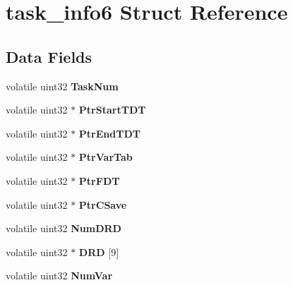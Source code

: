 \hypertarget{structtask__info6}{}\section{task\+\_\+info6 Struct Reference}
\label{structtask__info6}
\subsection*{Data Fields}
\begin{DoxyCompactItemize}
\item 
\mbox{\label{structtask__info6_a00688cd13d90e64af8a6f8ddcfe17eef}} 
volatile uint32 {\bfseries Task\+Num}
\item 
\mbox{\label{structtask__info6_a7cc9676280f0540792221f977de6d79a}} 
volatile uint32 $\ast$ {\bfseries Ptr\+Start\+T\+DT}
\item 
\mbox{\label{structtask__info6_a6288cccb93cd49597702a9d2d3916c34}} 
volatile uint32 $\ast$ {\bfseries Ptr\+End\+T\+DT}
\item 
\mbox{\label{structtask__info6_ab35b8516e2d64d15ef0f31ded004218b}} 
volatile uint32 $\ast$ {\bfseries Ptr\+Var\+Tab}
\item 
\mbox{\label{structtask__info6_a07a06993654ea53f0c0509459d3e17e4}} 
volatile uint32 $\ast$ {\bfseries Ptr\+F\+DT}
\item 
\mbox{\label{structtask__info6_a16d79a3106a103bce966be33640194c6}} 
volatile uint32 $\ast$ {\bfseries Ptr\+C\+Save}
\item 
\mbox{\label{structtask__info6_a3cd9aa13119e41a8a22f9f690e0ed13a}} 
volatile uint32 {\bfseries Num\+D\+RD}
\item 
\mbox{\label{structtask__info6_a726f9e59f3b655c3c159f812aebc8993}} 
volatile uint32 $\ast$ {\bfseries D\+RD} \mbox{[}9\mbox{]}
\item 
\mbox{\label{structtask__info6_ae0ab6aea12639d3bbbd044b4b0979fd1}} 
volatile uint32 {\bfseries Num\+Var}
\item 

\end{DoxyCompactItemize}
